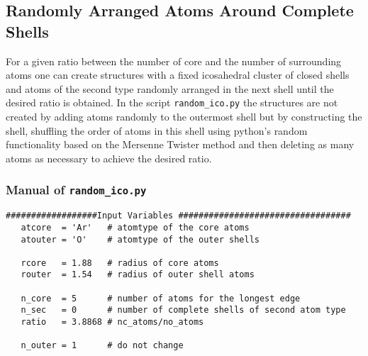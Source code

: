 \subsection{Randomly Arranged Atoms Around Complete Shells}
For a given ratio between the number of core and the number of surrounding
atoms one can create structures with a fixed icosahedral cluster of closed
shells and atoms
of the second type randomly arranged in the next shell until the desired
ratio is obtained.
In the script \lstinline|random_ico.py| the structures are not created
by adding atoms randomly to the outermost shell but by constructing the
shell, shuffling the order of atoms in this shell using python's random
functionality based on the Mersenne Twister method \cite{python_random,Matsumoto98}
and then deleting as many
atoms as necessary to achieve the desired ratio. 

\subsubsection{Manual of \lstinline|random_ico.py|}
\begin{lstlisting}
##################Input Variables ##################################
   atcore  = 'Ar'   # atomtype of the core atoms
   atouter = 'O'    # atomtype of the outer shells
   
   rcore   = 1.88   # radius of core atoms
   router  = 1.54   # radius of outer shell atoms
   
   n_core  = 5      # number of atoms for the longest edge
   n_sec   = 0      # number of complete shells of second atom type
   ratio   = 3.8868 # nc_atoms/no_atoms
   
   n_outer = 1      # do not change
\end{lstlisting}

